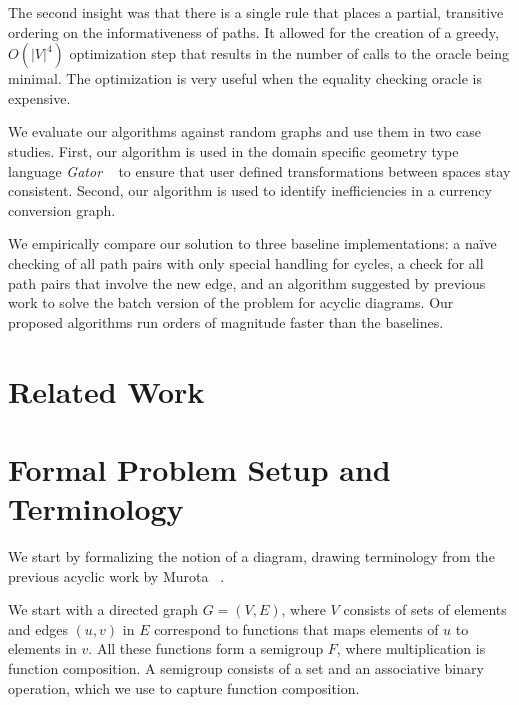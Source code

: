 \documentclass[sigplan,review,anonymous]{acmart}
\begin{document}
The second insight was that there is a single rule that places a partial, transitive ordering on the informativeness of paths.
It allowed for the creation of a greedy, $O(|V|^4)$ optimization step that results in the number of calls to the oracle being minimal.
The optimization is very useful when the equality checking oracle is expensive.

We evaluate our algorithms against random graphs and use them in two case studies.
First, our algorithm is used in the domain specific geometry type language \textit{Gator} ~\cite{gator} to ensure that user defined transformations between spaces stay consistent.
Second, our algorithm is used to identify inefficiencies in a currency conversion graph.

We empirically compare our solution to three baseline implementations: a na\"{i}ve checking of all path pairs with only special handling for cycles, a check for all path pairs that involve the new edge, and an algorithm suggested by previous work to solve the batch version of the problem for acyclic diagrams.
Our proposed algorithms run orders of magnitude faster than the baselines.

\section{Related Work}


\section{Formal Problem Setup and Terminology}

We start by formalizing the notion of a diagram, drawing terminology from the previous acyclic work by Murota ~\cite{commutative}.

We start with a directed graph $G=(V,E)$, where $V$ consists of sets of elements and edges $(u, v)$ in $E$ correspond to functions that maps elements of $u$ to elements in $v$.
All these functions form a semigroup $F$, where multiplication is function composition.
A semigroup consists of a set and an associative binary operation, which we use to capture function composition.
\end{document}
